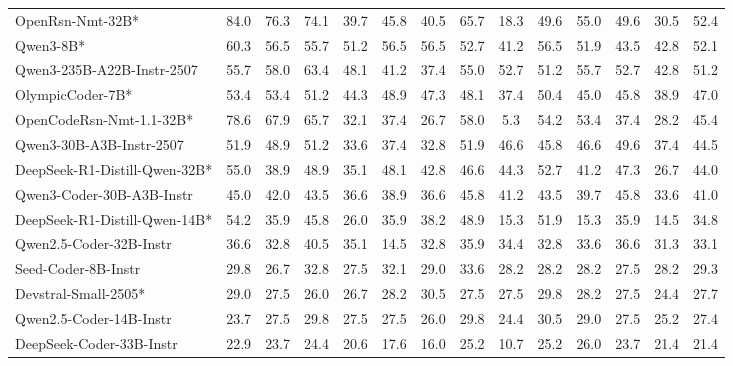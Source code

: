 \begin{table}[hbt]
{\begin{tabular}{l *{13}{c}}
OpenRsn-Nmt-32B* & 	84.0& 	76.3& 	74.1& 	39.7& 	45.8& 	40.5& 	65.7& 	18.3& 	49.6& 	55.0& 	49.6& 	30.5& 	52.4\\												
\rowcolor{gray!10}
Qwen3-8B* & 	60.3& 	56.5& 	55.7& 	51.2& 	56.5& 	56.5& 	52.7& 	41.2& 	56.5& 	51.9& 	43.5& 	42.8& 	52.1\\												
Qwen3-235B-A22B-Instr-2507&	55.7& 	58.0& 	63.4& 	48.1& 	41.2& 	37.4& 	55.0& 	52.7& 	51.2& 	55.7& 	52.7& 	42.8& 	51.2\\											
\rowcolor{gray!10}
OlympicCoder-7B* & 	53.4& 	53.4& 	51.2& 	44.3& 	48.9& 	47.3& 	48.1& 	37.4& 	50.4& 	45.0& 	45.8& 	38.9& 	47.0\\												
OpenCodeRsn-Nmt-1.1-32B* & 	78.6& 	67.9& 	65.7& 	32.1& 	37.4& 	26.7& 	58.0& 	5.3& 	54.2& 	53.4& 	37.4& 	28.2& 	45.4\\									
\rowcolor{gray!10}
Qwen3-30B-A3B-Instr-2507&	51.9& 	48.9& 	51.2& 	33.6& 	37.4& 	32.8& 	51.9& 	46.6& 	45.8& 	46.6& 	49.6& 	37.4& 	44.5\\												
DeepSeek-R1-Distill-Qwen-32B* & 	55.0& 	38.9& 	48.9& 	35.1& 	48.1& 	42.8& 	46.6& 	44.3& 	52.7& 	41.2& 	47.3& 	26.7& 	44.0\\										
\rowcolor{gray!10}
Qwen3-Coder-30B-A3B-Instr & 	45.0& 	42.0& 	43.5& 	36.6& 	38.9& 	36.6& 	45.8& 	41.2& 	43.5& 	39.7& 	45.8& 	33.6& 	41.0\\												
DeepSeek-R1-Distill-Qwen-14B* & 	54.2& 	35.9& 	45.8& 	26.0& 	35.9& 	38.2& 	48.9& 	15.3& 	51.9& 	15.3& 	35.9& 	14.5& 	34.8\\											
\rowcolor{gray!10}
Qwen2.5-Coder-32B-Instr & 	36.6& 	32.8& 	40.5& 	35.1& 	14.5& 	32.8& 	35.9& 	34.4& 	32.8& 	33.6& 	36.6& 	31.3& 	33.1\\												
Seed-Coder-8B-Instr & 	29.8& 	26.7& 	32.8& 	27.5& 	32.1& 	29.0& 	33.6& 	28.2& 	28.2& 	28.2& 	27.5& 	28.2& 	29.3\\												
\rowcolor{gray!10}
Devstral-Small-2505* & 	29.0& 	27.5& 	26.0& 	26.7& 	28.2& 	30.5& 	27.5& 	27.5& 	29.8& 	28.2& 	27.5& 	24.4& 	27.7\\												
Qwen2.5-Coder-14B-Instr & 	23.7& 	27.5& 	29.8& 	27.5& 	27.5& 	26.0& 	29.8& 	24.4& 	30.5& 	29.0& 	27.5& 	25.2& 	27.4\\												
\rowcolor{gray!10}
DeepSeek-Coder-33B-Instr & 	22.9& 	23.7& 	24.4& 	20.6& 	17.6& 	16.0& 	25.2& 	10.7& 	25.2& 	26.0& 	23.7& 	21.4& 	21.4\\												

\bottomrule
\end{tabular}
}
\end{table}
